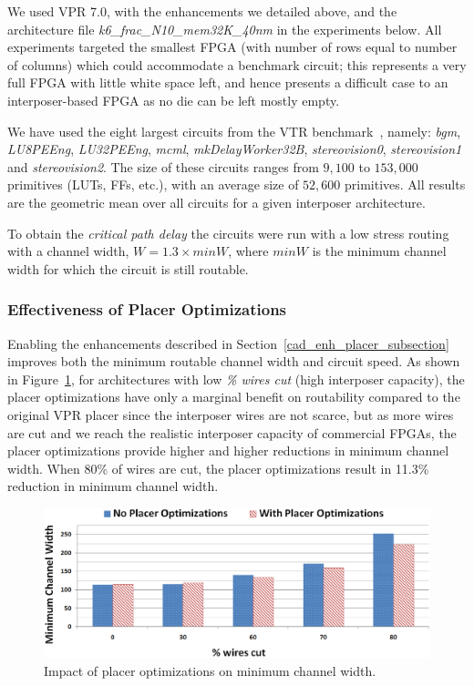 \documentclass[journal]{IEEEtran}
\begin{document}
We used VPR 7.0, with the enhancements we detailed above, and the architecture file \textit{k6\_frac\_N10\_mem32K\_40nm} in the experiments below. All experiments targeted the smallest FPGA (with number of rows equal to number of columns) which could accommodate a benchmark circuit; this represents a very full FPGA with little white space left, and hence presents a difficult case to an interposer-based FPGA as no die can be left mostly empty. 

We have used the eight largest circuits from the VTR benchmark~\cite{vtr2012}, namely: \textit{bgm}, \textit{LU8PEEng}, \textit{LU32PEEng}, \textit{mcml}, \textit{mkDelayWorker32B}, \textit{stereovision0}, \textit{stereovision1} and \textit{stereovision2}. The size of these circuits ranges from $9,100$ to $153,000$ primitives (LUTs, FFs, etc.), with an average size of $52,600$ primitives. All results are the geometric mean over all circuits for a given interposer architecture.

To obtain the \textit{critical path delay} the circuits were run with a low stress routing with a channel width, $W = 1.3 \times minW$, where $minW$ is the minimum channel width for which the circuit is still routable. 

\subsubsection{Effectiveness of Placer Optimizations}
\label{sec:effectiveness_of_placer_enhancements}
Enabling the enhancements described in Section~\ref{cad_enh_placer_subsection} improves both the minimum routable channel width and circuit speed. As shown in Figure~\ref{fig:comparison_minW}, for architectures with low \textit{\% wires cut} (high interposer capacity), the placer optimizations have only a marginal benefit on routability compared to the original VPR placer since the interposer wires are not scarce, but as more wires are cut and we reach the realistic interposer capacity of commercial FPGAs, the placer optimizations provide higher and higher reductions in minimum channel width. When 80\% of wires are cut, the placer optimizations result in 11.3\% reduction in minimum channel width.

\begin{figure}[!htbp]
\centering
\includegraphics[width=\linewidth]{placer_opt_minChW_2.eps}
\caption{Impact of placer optimizations on minimum channel width.}
\label{fig:comparison_minW}
\end{figure}
\end{document}
